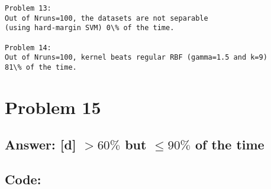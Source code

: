\documentclass[11pt]{article}
\begin{document}
    \begin{Verbatim}[commandchars=\\\{\}]
Problem 13:
Out of Nruns=100, the datasets are not separable
(using hard-margin SVM) 0\% of the time.

Problem 14:
Out of Nruns=100, kernel beats regular RBF (gamma=1.5 and k=9)
81\% of the time.
    \end{Verbatim}

    \hypertarget{problem-15}{%
\section{Problem 15}\label{problem-15}}

\hypertarget{answer-d-60-but-le-90-of-the-time}{%
\subsection{\texorpdfstring{Answer: {[}d{]} \(> 60\%\) but
\(\le 90\%\) of the
time}{Answer: {[}d{]} \textgreater{} 60\textbackslash{}\% but \textbackslash{}le 90\textbackslash{}\% of the time}}\label{answer-d-60-but-le-90-of-the-time}}

\hypertarget{code}{%
\subsection{Code:}\label{code}}
\end{document}
